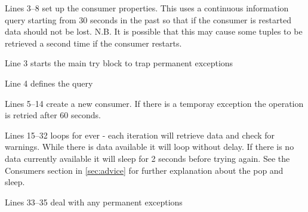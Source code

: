 Lines 3--8 set up the consumer properties. This uses a continuous
information query starting from 30 seconds in the past so that if the
consumer is restarted data should not be lost. N.B. It is possible
that this may cause some tuples to be retrieved a second time if the
consumer restarts.

Line 3 starts the main try block to trap permanent exceptions

Line 4 defines the query

Lines 5--14 create a new consumer. If there is a temporay exception the
operation is retried after 60 seconds.

Lines 15--32 loops for ever - each iteration will retrieve data and
check for warnings. While there is data available it will loop without
delay. If there is no data currently available it will sleep for 2
seconds before trying again. See the Consumers section in
\ref{sec:advice} for further explanation about the pop and sleep.

Lines 33--35 deal with any permanent exceptions
